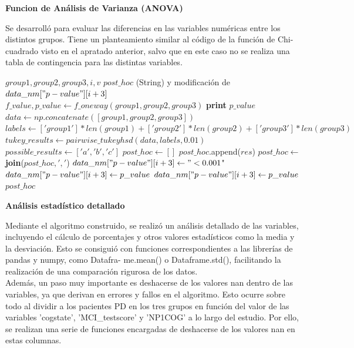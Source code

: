 \documentclass[12pt]{article}
\begin{document}
\begin{description}
	\item {\textbf{Funcion de Análisis de Varianza (ANOVA)}} 
	
	Se desarrolló para evaluar las diferencias en las variables numéricas entre los distintos grupos. Tiene un planteamiento similar al código de la función de Chi-cuadrado visto en el apratado anterior, salvo que en este caso no se realiza una tabla de contingencia para las distintas variables.\\
\begin{algorithm}
	\caption{one\_way\_anova\_with\_posthoc}
	\begin{algorithmic}
		\REQUIRE $group1, group2, group3, i, v$
		\ENSURE $post\_hoc$ (String) y modificación de $data\_nm["p-value"][i+3]$
		\STATE $f\_value, p\_value \leftarrow f\_oneway(group1, group2, group3)$
		\STATE \textbf{print} $p\_value$
		\STATE $data \leftarrow np.concatenate([group1, group2, group3])$
		\STATE $labels \leftarrow ['group1'] * len(group1) + ['group2'] * len(group2) + ['group3'] * len(group3)$
		\STATE $tukey\_results \leftarrow pairwise\_tukeyhsd(data, labels, 0.01)$
		\STATE $possible\_results \leftarrow ['a', 'b', 'c']$
		\STATE $post\_hoc \leftarrow []$
		\STATE $post\_hoc$.append($res$)
		\ENDIF
		\ENDFOR
		\STATE $post\_hoc \leftarrow$ \textbf{join}($post\_hoc, ','$)
		\STATE $data\_nm["p-value"][i+3] \leftarrow "< 0.001$"
		\ELSE
		\STATE $data\_nm["p-value"][i+3] \leftarrow p\_value$
		\ENDIF
		\ELSE
		\STATE $data\_nm["p-value"][i+3] \leftarrow p\_value$
		\ENDIF
		\RETURN $post\_hoc$
	\end{algorithmic}
\end{algorithm}

	\item {\textbf{Análisis estadístico detallado}} 
	
	Mediante el algoritmo construido, se realizó un análisis detallado de las variables, incluyendo el cálculo de porcentajes y otros valores estadísticos como la media y la desviación. Esto se consiguió con funciones correspondientes a las librerías de pandas y numpy, como Datafra-
	me.mean() o Dataframe.std(), facilitando la realización de una comparación rigurosa de los datos. \\
	
	Además, un paso muy importante es deshacerse de los valores nan dentro de las variables, ya que derivan en errores y fallos en el algoritmo. Esto ocurre sobre todo al dividir a los pacientes PD en los tres grupos en función del valor de las variables 'cogstate', 'MCI\_testscore' y 'NP1COG' a lo largo del estudio. Por ello, se realizan una serie de funciones encargadas de deshacerse de los valores nan en estas columnas.\\	
	

\end{description}
\end{document}
